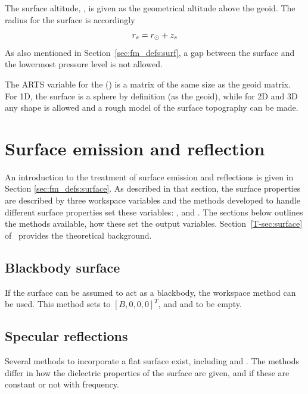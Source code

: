 The surface altitude, , is given as the geometrical altitude above the
geoid. The radius for the surface is accordingly
\begin{equation}
  r_{s} = r_{\odot} + z_{s}
 \label{eq:fm_defs:zsurface}
\end{equation}
As also mentioned in Section~\ref{sec:fm_defs:surf}, a gap between the surface
and the lowermost pressure level is not allowed.

The ARTS variable for the 
() is a matrix of the same size as the geoid
matrix. For 1D, the surface is a sphere by definition (as the geoid),
while for 2D and 3D any shape is allowed and a rough model of the
surface topography can be made. 




\section{Surface emission and reflection}
\label{sec:surf:eandr}

An introduction to the treatment of surface emission and reflections is given
in Section \ref{sec:fm_defs:surface}. As described in that section, the surface
properties are described by three workspace variables and the methods developed
to handle different surface properties set these variables:
,  and
. The sections below outlines the methods available,
how these set the output variables.
Section~\ref{T-sec:surface} of \theory\ provides the theoretical
background.



\subsection{Blackbody surface}
%
If the surface can be assumed to act as a blackbody, the workspace method
 can be used. This method sets
 to $[B,0,0,0]^T$, and 
and  to be empty.




\subsection{Specular reflections}
%
Several methods to incorporate a flat surface exist, including
 and
. The methods differ in how the dielectric
properties of the surface are given, and if these are constant or not with
frequency.

